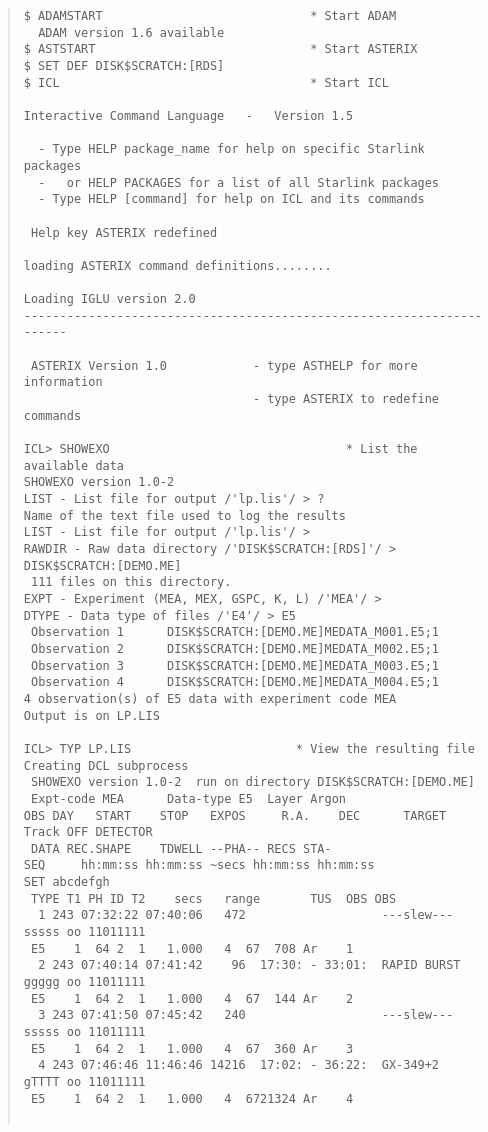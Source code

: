 \begin{quote}\small
\begin{verbatim}
$ ADAMSTART                             * Start ADAM
  ADAM version 1.6 available
$ ASTSTART                              * Start ASTERIX
$ SET DEF DISK$SCRATCH:[RDS]
$ ICL                                   * Start ICL

Interactive Command Language   -   Version 1.5

  - Type HELP package_name for help on specific Starlink packages
  -   or HELP PACKAGES for a list of all Starlink packages
  - Type HELP [command] for help on ICL and its commands

 Help key ASTERIX redefined

loading ASTERIX command definitions........

Loading IGLU version 2.0
----------------------------------------------------------------------

 ASTERIX Version 1.0            - type ASTHELP for more information
                                - type ASTERIX to redefine commands

ICL> SHOWEXO                                 * List the available data
SHOWEXO version 1.0-2
LIST - List file for output /'lp.lis'/ > ?
Name of the text file used to log the results
LIST - List file for output /'lp.lis'/ > 
RAWDIR - Raw data directory /'DISK$SCRATCH:[RDS]'/ > DISK$SCRATCH:[DEMO.ME]
 111 files on this directory.
EXPT - Experiment (MEA, MEX, GSPC, K, L) /'MEA'/ > 
DTYPE - Data type of files /'E4'/ > E5
 Observation 1      DISK$SCRATCH:[DEMO.ME]MEDATA_M001.E5;1
 Observation 2      DISK$SCRATCH:[DEMO.ME]MEDATA_M002.E5;1
 Observation 3      DISK$SCRATCH:[DEMO.ME]MEDATA_M003.E5;1
 Observation 4      DISK$SCRATCH:[DEMO.ME]MEDATA_M004.E5;1
4 observation(s) of E5 data with experiment code MEA
Output is on LP.LIS

ICL> TYP LP.LIS                       * View the resulting file
Creating DCL subprocess
 SHOWEXO version 1.0-2  run on directory DISK$SCRATCH:[DEMO.ME]
 Expt-code MEA      Data-type E5  Layer Argon 
OBS DAY   START    STOP   EXPOS     R.A.    DEC      TARGET  Track OFF DETECTOR
 DATA REC.SHAPE    TDWELL --PHA-- RECS STA- 
SEQ     hh:mm:ss hh:mm:ss ~secs hh:mm:ss hh:mm:ss                  SET abcdefgh
 TYPE T1 PH ID T2    secs   range       TUS  OBS OBS
  1 243 07:32:22 07:40:06   472                   ---slew---  sssss oo 11011111
 E5    1  64 2  1   1.000   4  67  708 Ar    1    
  2 243 07:40:14 07:41:42    96  17:30: - 33:01:  RAPID BURST ggggg oo 11011111
 E5    1  64 2  1   1.000   4  67  144 Ar    2    
  3 243 07:41:50 07:45:42   240                   ---slew---  sssss oo 11011111
 E5    1  64 2  1   1.000   4  67  360 Ar    3    
  4 243 07:46:46 11:46:46 14216  17:02: - 36:22:  GX-349+2    gTTTT oo 11011111
 E5    1  64 2  1   1.000   4  6721324 Ar    4    


\end{verbatim}
\end{quote}

